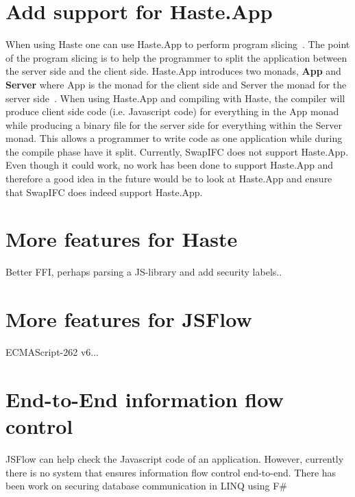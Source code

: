 \section{Add support for Haste.App}
When using Haste one can use Haste.App to perform program slicing~\cite{haste-symposium}. The point of the program slicing is to help the programmer to split the application between the server side and the client side. Haste.App introduces two monads, \textbf{App} and \textbf{Server} where App is the monad for the client side and Server the monad for the server side~\cite{haste-app}. When using Haste.App and compiling with Haste, the compiler will produce client side code (i.e. Javascript code) for everything in the App monad while producing a binary file for the server side for everything within the Server monad. This allows a programmer to write code as one application while during the compile phase have it split. Currently, SwapIFC does not support Haste.App. Even though it could work, no work has been done to support Haste.App and therefore a good idea in the future would be to look at Haste.App and ensure that SwapIFC does indeed support Haste.App.

\section{More features for Haste}
Better FFI, perhaps parsing a JS-library and add security labels..

\section{More features for JSFlow}
ECMAScript-262 v6...

\section{End-to-End information flow control}
JSFlow can help check the Javascript code of an application. However, currently there is no system that ensures information flow control end-to-end. There has been work on securing database communication in LINQ using F\#~\cite{selinq}
